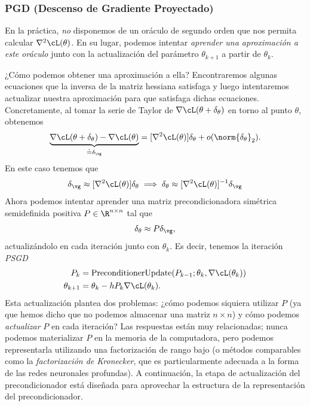 \documentclass[../../book-main_es.tex]{subfiles}
\begin{document}
\subsubsection{PGD (Descenso de Gradiente Proyectado)}

En la práctica, \textit{no} disponemos de un oráculo de segundo orden que
nos permita calcular \(\nabla^{2}\cL(\theta)\). En su lugar, podemos
intentar \textit{aprender una aproximación a este oráculo} junto con la
actualización del parámetro \(\theta_{k + 1}\) a partir de \(\theta_{k}\).

¿Cómo podemos obtener una aproximación a ella? Encontraremos algunas ecuaciones
que la inversa de la matriz hessiana satisfaga y luego intentaremos actualizar nuestra
aproximación para que satisfaga dichas ecuaciones. Concretamente, al tomar la
serie de Taylor de \(\nabla \cL(\theta + \delta_{\theta})\) en torno al
punto \(\theta\), obtenemos
\begin{equation}
    \underbrace{\nabla \cL(\theta + \delta_{\theta}) - \nabla
    \cL(\theta)}_{\doteq \delta_{\vg}} = [\nabla^{2}
    \cL(\theta)]\delta_{\theta} + o(\norm{\delta_{\theta}}_{2}).
\end{equation}
En este caso tenemos que
\begin{equation}
    \delta_{\vg} \approx [\nabla^{2}\cL(\theta)]\delta_{\theta}
    \implies \delta_{\theta} \approx [\nabla^{2}\cL(\theta)]^{-1}\delta_{\vg}
\end{equation}
Ahora podemos intentar aprender una matriz precondicionadora simétrica semidefinida positiva
\(P \in \R^{n \times n}\) tal que
\begin{equation}
    \delta_{\theta} \approx P\delta_{\vg},
\end{equation}
actualizándolo en cada iteración junto con \(\theta_{k}\). Es decir, tenemos
la iteración \textit{PSGD}
\begin{align}
    P_{k}
    &= \mathrm{PreconditionerUpdate}(P_{k - 1}; \theta_{k}, \nabla
    \cL(\theta_{k})) \\
    \theta_{k + 1}
    &= \theta_{k} - hP_{k}\nabla \cL(\theta_{k}).
\end{align}
Esta actualización plantea dos problemas: ¿cómo podemos siquiera utilizar \(P\) (ya que
hemos dicho que no podemos almacenar una matriz \(n \times n\)) y cómo podemos
\textit{actualizar} \(P\) en cada iteración? Las respuestas están muy
relacionadas; nunca podemos materializar \(P\) en la memoria de la computadora, pero
podemos representarla utilizando una factorización de rango bajo (o métodos comparables
    como la \textit{factorización de Kronecker}, que es
particularmente adecuada a la forma de las redes neuronales profundas). A continuación, la
etapa de actualización del precondicionador está diseñada para aprovechar la estructura de
la representación del precondicionador.
\end{document}
